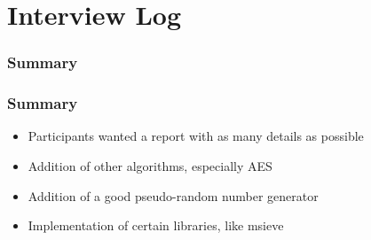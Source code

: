 \section{Interview Log}


\subsubsection{Summary}

\begin{frame}
\frametitle{Summary}
\begin{itemize}
\item Participants wanted a report with as many details as
      possible
\item Addition of other algorithms, especially AES
\item Addition of a good pseudo-random number generator
\item Implementation of certain libraries, like msieve
\end{itemize}
\end{frame}

